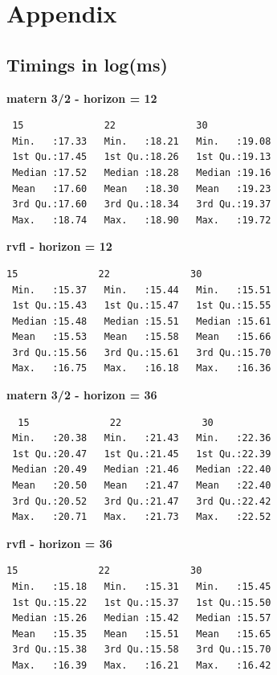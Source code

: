 \newpage

\section{Appendix}

\subsection{Timings in log(ms)}
\label{sec:timings}

\textbf{matern 3/2 - horizon = 12}
\begin{verbatim}
 15              22              30       
 Min.   :17.33   Min.   :18.21   Min.   :19.08  
 1st Qu.:17.45   1st Qu.:18.26   1st Qu.:19.13  
 Median :17.52   Median :18.28   Median :19.16  
 Mean   :17.60   Mean   :18.30   Mean   :19.23  
 3rd Qu.:17.60   3rd Qu.:18.34   3rd Qu.:19.37  
 Max.   :18.74   Max.   :18.90   Max.   :19.72
\end{verbatim}

\textbf{rvfl - horizon = 12}
\begin{verbatim}
15              22              30       
 Min.   :15.37   Min.   :15.44   Min.   :15.51  
 1st Qu.:15.43   1st Qu.:15.47   1st Qu.:15.55  
 Median :15.48   Median :15.51   Median :15.61  
 Mean   :15.53   Mean   :15.58   Mean   :15.66  
 3rd Qu.:15.56   3rd Qu.:15.61   3rd Qu.:15.70  
 Max.   :16.75   Max.   :16.18   Max.   :16.36
\end{verbatim}

\textbf{matern 3/2 - horizon = 36}
\begin{verbatim}
  15              22              30       
 Min.   :20.38   Min.   :21.43   Min.   :22.36  
 1st Qu.:20.47   1st Qu.:21.45   1st Qu.:22.39  
 Median :20.49   Median :21.46   Median :22.40  
 Mean   :20.50   Mean   :21.47   Mean   :22.40  
 3rd Qu.:20.52   3rd Qu.:21.47   3rd Qu.:22.42  
 Max.   :20.71   Max.   :21.73   Max.   :22.52
\end{verbatim}

\textbf{rvfl - horizon = 36}
\begin{verbatim}
15              22              30       
 Min.   :15.18   Min.   :15.31   Min.   :15.45  
 1st Qu.:15.22   1st Qu.:15.37   1st Qu.:15.50  
 Median :15.26   Median :15.42   Median :15.57  
 Mean   :15.35   Mean   :15.51   Mean   :15.65  
 3rd Qu.:15.38   3rd Qu.:15.58   3rd Qu.:15.70  
 Max.   :16.39   Max.   :16.21   Max.   :16.42
\end{verbatim}
